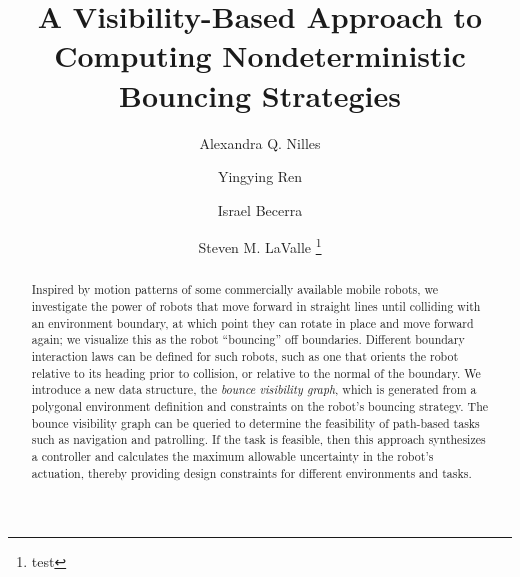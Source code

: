 \documentclass[]{styles/svproc}  %
\begin{document}
\mainmatter              %


\title{A Visibility-Based Approach to Computing Nondeterministic Bouncing
Strategies}

\author{Alexandra Q. Nilles \and Yingying Ren \and Israel
Becerra \and Steven M. LaValle%
\thanks{
{test}
}
}
\institute{}


\maketitle

\begin{abstract}
Inspired by motion patterns of some commercially available mobile robots, we investigate the power of robots that 
move forward in straight lines
until colliding with an environment boundary, at which point they can rotate in
place and move forward again; we visualize this as the robot ``bouncing'' off
boundaries. Different boundary interaction laws can be
defined for such robots, such as one that orients the robot relative to its
heading prior to collision, or relative to the normal of the boundary. We introduce a new data structure, the {\em bounce visibility graph}, which is generated 
from a polygonal environment definition and constraints on the robot's bouncing 
strategy. The bounce visibility graph can be queried to determine the feasibility 
of path-based tasks such as navigation and patrolling. If the task is feasible, then this
approach synthesizes a controller and calculates the maximum allowable 
uncertainty in the robot's actuation, thereby providing design constraints for different 
environments and tasks.
\end{abstract}
\end{document}
